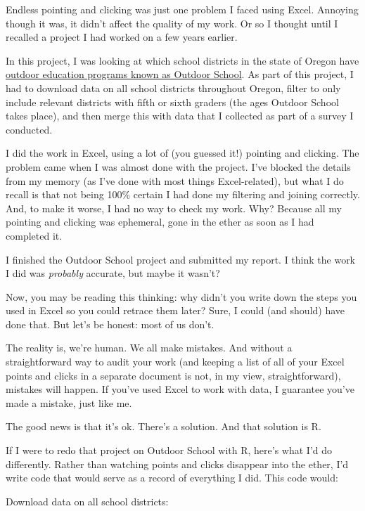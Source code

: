 \documentclass[
]{book}
\begin{document}
Endless pointing and clicking was just one problem I faced using Excel. Annoying though it was, it didn't affect the quality of my work. Or so I thought until I recalled a project I had worked on a few years earlier.

In this project, I was looking at which school districts in the state of Oregon have \href{https://oregonstate.app.box.com/s/83g5sjdm88xgqdxfze0ri7qo4uff5sj7}{outdoor education programs known as Outdoor School}. As part of this project, I had to download data on all school districts throughout Oregon, filter to only include relevant districts with fifth or sixth graders (the ages Outdoor School takes place), and then merge this with data that I collected as part of a survey I conducted.

I did the work in Excel, using a lot of (you guessed it!) pointing and clicking. The problem came when I was almost done with the project. I've blocked the details from my memory (as I've done with most things Excel-related), but what I do recall is that not being 100\% certain I had done my filtering and joining correctly. And, to make it worse, I had no way to check my work. Why? Because all my pointing and clicking was ephemeral, gone in the ether as soon as I had completed it.

I finished the Outdoor School project and submitted my report. I think the work I did was \emph{probably} accurate, but maybe it wasn't?

Now, you may be reading this thinking: why didn't you write down the steps you used in Excel so you could retrace them later? Sure, I could (and should) have done that. But let's be honest: most of us don't.

The reality is, we're human. We all make mistakes. And without a straightforward way to audit your work (and keeping a list of all of your Excel points and clicks in a separate document is not, in my view, straightforward), mistakes will happen. If you've used Excel to work with data, I guarantee you've made a mistake, just like me.

The good news is that it's ok. There's a solution. And that solution is R.

If I were to redo that project on Outdoor School with R, here's what I'd do differently. Rather than watching points and clicks disappear into the ether, I'd write code that would serve as a record of everything I did. This code would:

Download data on all school districts:
\end{document}

